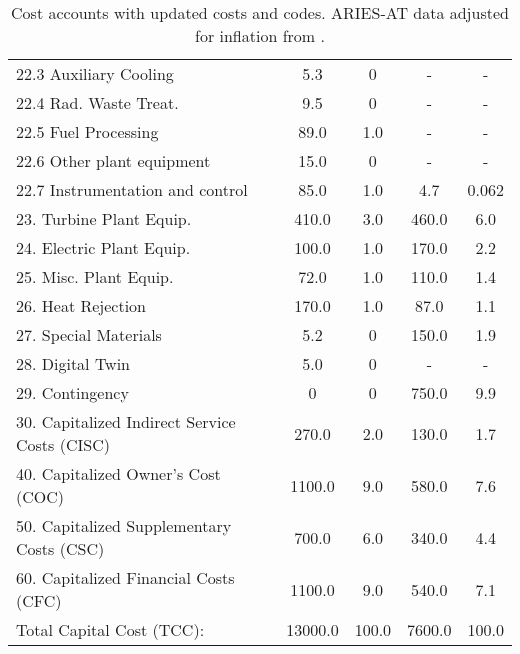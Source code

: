 \begin{table}[h!]
{\begin{tabular}{lcccc}
\hspace{10mm}22.3 Auxiliary Cooling & 5.3 & 0 & - & - \\
\hspace{10mm}22.4 Rad. Waste Treat. & 9.5 & 0 & - & - \\
\hspace{10mm}22.5 Fuel Processing & 89.0 & 1.0 & - & - \\
\hspace{10mm}22.6 Other plant equipment & 15.0 & 0 & - & - \\
\hspace{10mm}22.7 Instrumentation and control & 85.0 & 1.0 & 4.7 & 0.062 \\
\hspace{5mm}23. Turbine Plant Equip. & 410.0 & 3.0 & 460.0 & 6.0 \\
\hspace{5mm}24. Electric Plant Equip. & 100.0 & 1.0 & 170.0 & 2.2 \\
\hspace{5mm}25. Misc. Plant Equip. & 72.0 & 1.0 & 110.0 & 1.4 \\
\hspace{5mm}26. Heat Rejection & 170.0 & 1.0 & 87.0 & 1.1 \\
\hspace{5mm}27. Special Materials & 5.2 & 0 & 150.0 & 1.9 \\
\hspace{5mm}28. Digital Twin & 5.0 & 0 & - & - \\
\hspace{5mm}29. Contingency & 0 & 0 & 750.0 & 9.9 \\
30. Capitalized Indirect Service Costs (CISC) & 270.0 & 2.0 & 130.0 & 1.7 \\
40. Capitalized Owner’s Cost (COC) & 1100.0 & 9.0 & 580.0 & 7.6 \\
50. Capitalized Supplementary Costs (CSC) & 700.0 & 6.0 & 340.0 & 4.4 \\
60. Capitalized Financial Costs (CFC) & 1100.0 & 9.0 & 540.0 & 7.1 \\
\hline
Total Capital Cost (TCC): & 13000.0 & 100.0 & 7600.0 & 100.0 \\
\hline
\end{tabular}
}
\caption{Cost accounts with updated costs and codes. ARIES-AT data adjusted for inflation from \cite{gordon1986mirror}.}
\label{tab:costs_updated_codes}
\end{table}


